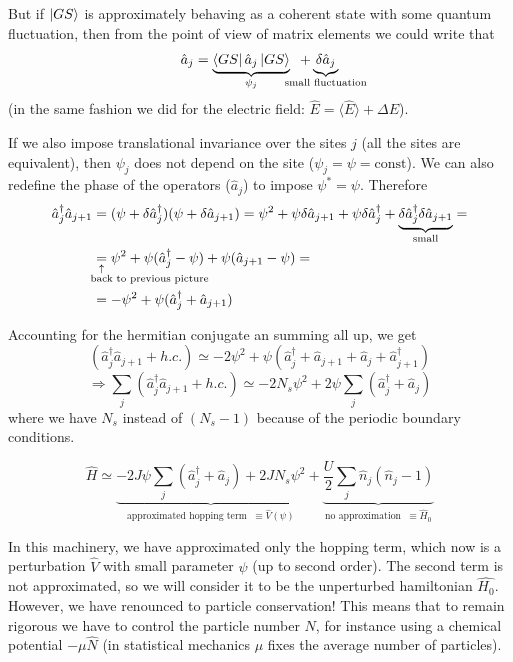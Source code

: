 But if $\ket{GS}$ is approximately behaving as a coherent state with some quantum fluctuation, then from the point of view of matrix elements we could write that $$\hat{a}_j = \underbrace{\bra{GS}\hat{a}_j\ket{GS}}_{\psi_j} \;\; + \underbrace{\delta\hat{a}_j}_{\mathclap{\text{small fluctuation}}}$$
(in the same fashion we did for the electric field: $\hat{E} = \langle\hat{E}\rangle + \Delta E$).

\noindent If we also impose translational invariance over the sites $j$ (all the sites are equivalent), then $\psi_j$ does not depend on the site ($\psi_j = \psi = \text{const}$). We can also redefine the phase of the operators ($\hat{a}_j$) to impose $\psi^*=\psi$. Therefore
\begin{align*}
    \hat{a}^\dag_j\hat{a}_{j+1} &= 
        (\psi + \delta \hat{a}^\dag_{j})(\psi + \delta \hat{a}_{j+1})
    = \psi^2 + \psi \delta \hat{a}_{j+1} + \psi\delta \hat{a}^\dag_{j} + \underbrace{\delta \hat{a}^\dag_{j}\delta \hat{a}_{j+1}}_{\text{small}}= \\
    &\equalexpl{back to previous picture} \psi^2 + \psi(\hat{a}^\dag_{j}-\psi) + \psi(\hat{a}_{j+1} - \psi) =\\
    &= -\psi^2 + \psi(\hat{a}^\dag_{j} + \hat{a}_{j+1})
\end{align*}

\noindent Accounting for the hermitian conjugate an summing all up, we get
\begin{equation*}
    (\hat{a}^\dag_{j}\hat{a}_{j+1} + h.c.) \simeq -2\psi^2 + \psi(\hat{a}^\dag_{j}+\hat{a}_{j+1}+\hat{a}_{j}+\hat{a}^\dag_{j+1})
\end{equation*}
\begin{equation*}
    \Rightarrow \sum_j (\hat{a}^\dag_{j}\hat{a}_{j+1} + h.c.) \simeq -2N_s\psi^2 + 2\psi\sum_j(\hat{a}^\dag_{j}+\hat{a}_{j})
\end{equation*}
where we have $N_s$ instead of $(N_s-1)$ because of the periodic boundary conditions.

\begin{equation}
    \hat{H} \simeq 
        \underbrace{-2J\psi\sum_j(\hat{a}^\dag_{j}+\hat{a}_{j}) + 2JN_s\psi^2}_{\text{approximated hopping term} \;\;\equiv \hat{V}(\psi)}
    + \underbrace{\frac{U}{2}\sum_j \hat{n}_j(\hat{n}_j-1)}_{\text{no approximation}\;\; \equiv \hat{H}_0}
\end{equation}

\noindent In this machinery, we have approximated only the hopping term, which now is a perturbation $\hat{V}$ with small parameter $\psi$ (up to second order). The second term is not approximated, so we will consider it to be the unperturbed hamiltonian $\hat{H_0}$. However, we have renounced to particle conservation! This means that to remain rigorous we have to control the particle number $N$, for instance using a chemical potential $-\mu\hat{N}$ (in statistical mechanics $\mu$ fixes the average number of particles).\\


